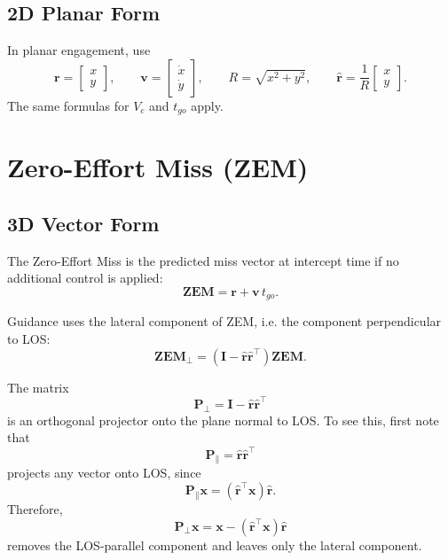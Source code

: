 \documentclass[11pt,a4paper]{article}
\begin{document}
\subsection{2D Planar Form}
In planar engagement, use
\begin{equation}
\mathbf{r} = \begin{bmatrix} x \\ y \end{bmatrix}, \qquad
\mathbf{v} = \begin{bmatrix} \dot{x} \\ \dot{y} \end{bmatrix}, \qquad
R = \sqrt{x^2+y^2}, \qquad
\hat{\mathbf{r}} = \frac{1}{R}\begin{bmatrix} x \\ y \end{bmatrix}.
\end{equation}
The same formulas for $V_c$ and $t_{go}$ apply.

\section{Zero-Effort Miss (ZEM)}
\subsection{3D Vector Form}
The Zero-Effort Miss is the predicted miss vector at intercept time if no additional control is applied:
\begin{equation}
\mathbf{ZEM} = \mathbf{r} + \mathbf{v}\,t_{go}.
\end{equation}

Guidance uses the lateral component of ZEM, i.e. the component perpendicular to LOS:
\begin{equation}
\mathbf{ZEM}_{\perp} = \left(\mathbf{I} - \hat{\mathbf{r}}\hat{\mathbf{r}}^\top\right)\mathbf{ZEM}.
\end{equation}

The matrix
\begin{equation}
\mathbf{P}_{\perp} = \mathbf{I} - \hat{\mathbf{r}}\hat{\mathbf{r}}^\top
\end{equation}
is an orthogonal projector onto the plane normal to LOS. To see this, first note that
\begin{equation}
\mathbf{P}_{\parallel} = \hat{\mathbf{r}}\hat{\mathbf{r}}^\top
\end{equation}
projects any vector onto LOS, since
\begin{equation}
\mathbf{P}_{\parallel}\mathbf{x} = (\hat{\mathbf{r}}^\top\mathbf{x})\hat{\mathbf{r}}.
\end{equation}
Therefore,
\begin{equation}
\mathbf{P}_{\perp}\mathbf{x} = \mathbf{x} - (\hat{\mathbf{r}}^\top\mathbf{x})\hat{\mathbf{r}}
\end{equation}
removes the LOS-parallel component and leaves only the lateral component.
\end{document}
